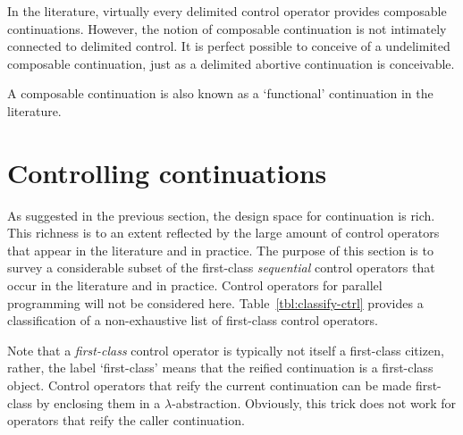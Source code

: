 \documentclass[12pt,phd,lfcs,twoside,openright,logo,leftchapter,normalheadings]{infthesis}
\theoremstyle{plain}
\theoremstyle{definition}
\begin{document}
In the literature, virtually every delimited control operator provides
composable continuations. However, the notion of composable
continuation is not intimately connected to delimited control. It is
perfect possible to conceive of a undelimited composable continuation,
just as a delimited abortive continuation is conceivable.

A composable continuation is also known as a `functional' continuation
in the literature.

\section{Controlling continuations}
\label{sec:controlling-continuations}
As suggested in the previous section, the design space for
continuation is rich. This richness is to an extent reflected by the
large amount of control operators that appear in the literature
and in practice.
%
The purpose of this section is to survey a considerable subset of the
first-class \emph{sequential} control operators that occur in the
literature and in practice. Control operators for parallel programming
will not be considered here.
%
Table~\ref{tbl:classify-ctrl} provides a classification of a
non-exhaustive list of first-class control operators.

Note that a \emph{first-class} control operator is typically not
itself a first-class citizen, rather, the label `first-class' means
that the reified continuation is a first-class object. Control
operators that reify the current continuation can be made first-class
by enclosing them in a $\lambda$-abstraction. Obviously, this trick
does not work for operators that reify the caller continuation.
\end{document}
